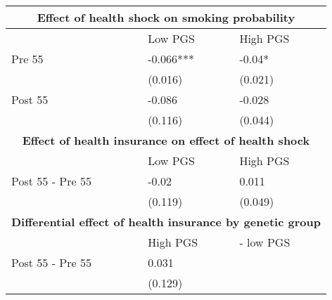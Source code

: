 % 
\begin{tabular}{lll}
  \toprule
  \multicolumn{3}{c}{ \textbf{Effect of health shock on smoking probability}} \\
 \midrule
 & Low PGS & High PGS \\ 
   \midrule
Pre 55 & -0.066*** & -0.04* \\ 
   & (0.016) & (0.021) \\ 
  Post 55 & -0.086 & -0.028 \\ 
   & (0.116) & (0.044) \\ 
   \toprule \multicolumn{3}{c}{ \textbf{Effect of health insurance on effect of health shock}} \\
 \midrule
 & Low PGS & High PGS \\ 
   \midrule
Post 55 - Pre 55 & -0.02 & 0.011 \\ 
   & (0.119) & (0.049) \\ 
   \toprule \multicolumn{3}{c}{ \textbf{Differential effect of health insurance by genetic group}} \\
 \midrule
 & High PGS  & - low PGS \\ 
   \midrule
Post 55 - Pre 55 & 0.031 &  \\ 
   & (0.129) &  \\ 
   \bottomrule
\end{tabular}
